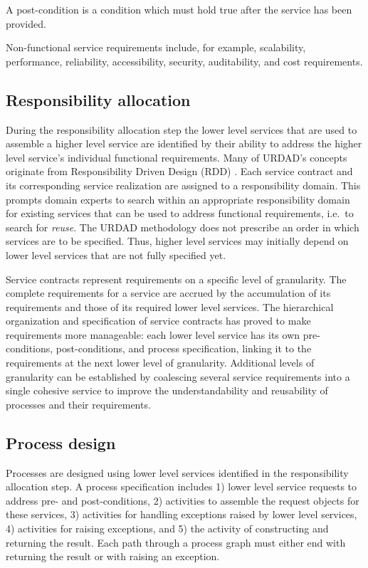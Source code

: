 A post-condition is a condition which must hold true after the service has been provided.

Non-functional service requirements include, for example, scalability, performance, reliability, accessibility, security, auditability, and cost requirements. 

\subsection{Responsibility allocation}

During the responsibility allocation step the lower level services that are used to assemble a higher level service are identified by their ability to address the higher level service's individual functional requirements. Many of URDAD's concepts originate from Responsibility Driven Design (RDD) \cite{wirfs-brock_object-oriented_1989,wirfs-brock_object_2002}. Each service contract and its corresponding service realization are assigned to a responsibility domain. This prompts domain experts to search within an appropriate responsibility domain for existing services that can be used to address functional requirements, i.e.\ to search for \emph{reuse}. The URDAD methodology does not prescribe an order in which services are to be specified. Thus, higher level services may initially depend on lower level services that are not fully specified yet.

Service contracts represent requirements on a specific level of granularity. The complete requirements for a service are accrued by the accumulation of its requirements and those of its required lower level services. The hierarchical organization and specification of service contracts has proved to make requirements more manageable: each lower level service has its own pre-conditions, post-conditions, and process specification, linking it to the requirements at the next lower level of granularity. Additional levels of granularity can be established by coalescing several service requirements into a single cohesive service to improve the understandability and reusability of processes and their requirements.

\subsection{Process design}

Processes are designed using lower level services identified in the responsibility allocation step. A process specification includes 1) lower level service requests to address pre- and post-conditions, 2) activities to assemble the request objects for these services, 3) activities for handling exceptions raised by lower level services, 4) activities for raising exceptions, and 5) the activity of constructing and returning the result. Each path through a process graph must either end with returning the result or with raising an exception.